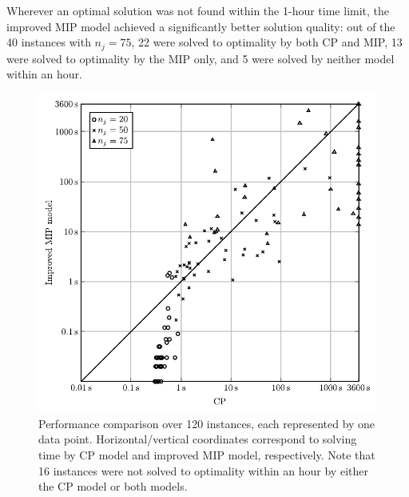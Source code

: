 \documentclass[oribibl]{llncs}
\begin{document}
Wherever an optimal solution was not found within the 1-hour time limit,
the improved MIP model achieved a significantly better solution quality: 
out of the 40 instances with $n_j = 75$, 22 were solved to optimality by both CP
and MIP, 13 were solved to optimality by the MIP only, and 5
were solved by neither model within an hour. 

\begin{figure}[h]
\centering
\includegraphics[height=0.55\textheight]{scattercomp.pdf}
\caption{Performance comparison over 120 instances, each represented by one data
point. Horizontal/vertical coordinates correspond to solving time by CP model
and improved MIP model, respectively. Note that 16 instances were not solved to
optimality within an hour by either the CP model or both models.}
\label{fig:scattercomp}
\end{figure}
\end{document}
